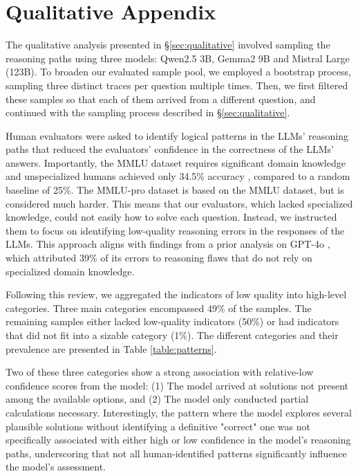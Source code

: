 
\section{Qualitative Appendix}
\label{sec:appendix-qualitative}

The qualitative analysis presented in \S\ref{sec:qualitative} involved sampling the reasoning paths using three models: Qwen2.5 3B, Gemma2 9B and Mistral Large (123B). To broaden our evaluated sample pool, we employed a bootstrap process, sampling three distinct traces per question multiple times. Then, we first filtered these samples so that each of them arrived from a different question, and continued with the sampling process described in \S\ref{sec:qualitative}.  

Human evaluators were asked to identify logical patterns in the LLMs' reasoning paths that reduced the evaluators' confidence in the correctness of the LLMs' answers. Importantly, the MMLU dataset requires significant domain knowledge and unspecialized humans achieved only 34.5\% accuracy \cite{hendrycks2020measuring}, compared to a random baseline of 25\%. The MMLU-pro dataset is based on the MMLU dataset, but is considered much harder. This means that our evaluators, which lacked specialized knowledge, could not easily how to solve each question. Instead, we instructed them to focus on identifying low-quality reasoning errors in the responses of the LLMs. This approach aligns with findings from a prior analysis on GPT-4o \cite{wang2024mmlupro}, which attributed 39\% of its errors to reasoning flaws that do not rely on specialized domain knowledge.

Following this review, we aggregated the indicators of low quality into high-level categories. Three main categories encompassed 49\% of the samples. The remaining samples either lacked low-quality indicators (50\%) or had indicators that did not fit into a sizable category (1\%). The different categories and their prevalence are presented in Table \ref{table:patterns}. 

Two of these three categories show a strong association with relative-low confidence scores from the model: (1) The model arrived at solutions not present among the available options, and (2) The model only conducted partial calculations necessary. Interestingly, the pattern where the model explores several plausible solutions without identifying a definitive "correct" one was not specifically associated with either high or low confidence in the model’s reasoning paths, underscoring that not all human-identified patterns significantly influence the model’s assessment. 

